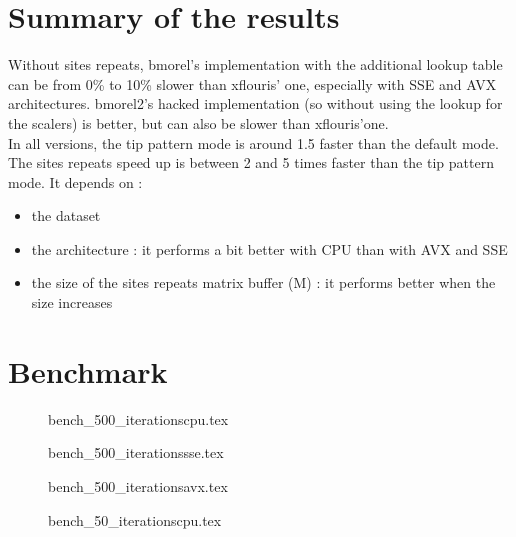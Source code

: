 \documentclass[a4paper]{article}
\begin{document}
\newpage

\section{Summary of the results}



Without sites repeats, bmorel's implementation with the additional lookup table can be from 0\% to 10\% slower than xflouris' one, especially with SSE and AVX architectures. bmorel2's hacked implementation (so without using the lookup for the scalers) is better, but can also be slower than xflouris'one.\\

In all versions, the tip pattern mode is around 1.5 faster than the default mode.\\

The sites repeats speed up is between 2 and 5 times faster than the tip pattern mode. 
It depends on :
\begin{itemize}
\item the dataset 
\item the architecture : it performs a bit better with CPU than with AVX and SSE
\item the size of the sites repeats matrix buffer (M) : it performs better when the size increases
\end{itemize}


\newpage

\section{Benchmark}


\begin{figure}[!htb]
{bench_500_iterationscpu.tex}
\end{figure}
\begin{figure}[!htb]
{bench_500_iterationssse.tex}
\end{figure}
\begin{figure}[!htb]
{bench_500_iterationsavx.tex}
\end{figure}

\begin{figure}[!htb]
{bench_50_iterationscpu.tex}
\end{figure}
\end{document}
